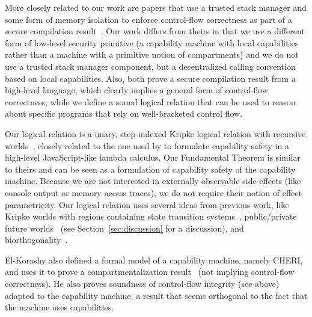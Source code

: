 \documentclass[compsoc,conference,letterpaper,fleqn]{IEEEtran}
\begin{document}
More closely related to our work are papers that use a trusted stack manager and
some form of memory isolation to enforce control-flow correctness as part of a
secure compilation
result~\citep{patrignani_modular_2016-1,juglaret_beyond_2016-1}. Our work
differs from theirs in that we use a different form of low-level security
primitive (a capability machine with local capabilities rather than a machine
with a primitive notion of compartments) and we do not use a trusted stack
manager component, but a decentralized calling convention based on local
capabilities. Also, both prove a secure compilation result from a high-level
language, which clearly implies a general form of control-flow correctness,
while we define a sound logical relation that can be used to reason about
specific programs that rely on well-bracketed control flow.

Our logical relation is a unary, step-indexed Kripke logical relation
with recursive
worlds~\cite{Appel:2001:IMR:504709.504712,Ahmed2004semantics,Birkedal:2011:SKM:1926385.1926401},
closely related to the one used by \citet{Devriese:2016ObjCap} to formulate
capability safety in a high-level JavaScript-like lambda calculus. Our
Fundamental Theorem is similar to theirs and can be seen as a formulation of
capability safety of the capability machine. Because we are not interested in
externally observable side-effects (like console output or memory access
traces), we do not require their notion of effect parametricity. Our logical
relation uses several ideas from previous work, like Kripke worlds with regions
containing state transition systems~\citep{Ahmed:popl09}, public/private future
worlds~\citep{Dreyer:jfp12} (see Section~\ref{sec:discussion} for a discussion), and
biorthogonality~\citep{pitts_operational_1998,benton_biorthogonality_2009-1,Hur:2011:KLR:1926385.1926402}.

El-Korashy also defined a formal model of a capability machine, namely CHERI,
and uses it to prove a compartmentalization
result~\citep{akram_el-korashy_formal_2016} (not implying control-flow
correctness). He also proves soundness of control-flow integrity (see above)
adapted to the capability machine, a result that seems orthogonal to the fact
that the machine uses capabilities.

\end{document}
